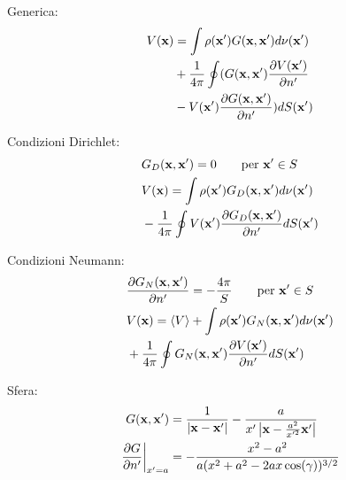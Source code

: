 Generica:
\begin{align*}
	V({\bf x})%
	&= \int \rho({\bf x'})G({\bf x},{\bf x'}) d\nu({\bf x'})\\%
	&+ \frac{1}{4\pi} \oint (%
		G({\bf x},{\bf x'})\frac{\p V({\bf x'})}{\p n'}\\%
	&- V({\bf x'}) \frac{\p G({\bf x},{\bf x'})}{\p n'}%
	) dS({\bf x'})
\end{align*}

Condizioni Dirichlet:
\begin{align*}
	&G_D({\bf x},{\bf x'}) = 0 \qquad \text{per } {\bf x'} \in S \\
	&V({\bf x}) = \int \rho({\bf x'})G_D({\bf x},{\bf x'}) d\nu({\bf x'})\\%
	&- \frac{1}{4\pi} \oint V({\bf x'}) \frac{\p G_D({\bf x},{\bf x'})}{\p n'} dS({\bf x'})
\end{align*}

Condizioni Neumann:
\begin{align*}
	&\frac{\p G_N({\bf x},{\bf x'})}{\p n'} = - \frac{4\pi}{S} \qquad \text{per } {\bf x'} \in S \\
	&V({\bf x}) = \langle V \rangle + \int \rho({\bf x'})G_N({\bf x},{\bf x'}) d\nu({\bf x'})\\%
	&+ \frac{1}{4\pi} \oint G_N({\bf x},{\bf x'})\frac{\p V({\bf x'})}{\p n'} dS({\bf x'})
\end{align*}


Sfera:
\begin{align*}
	G({\bf x}, {\bf x'}) &= \frac{1}{\left|{\bf x} - {\bf x'}\right|} - \frac{a}{x'\left|{{\bf x} - \frac{a^2}{x'^2}{\bf x'}}\right|} \\
	\left. \frac{\partial G}{\partial n'} \right|_{x'=a} &= - \frac{x^2 - a^2}{a(x^2 + a^2 - 2ax\cos(\gamma))^{3/2}}
\end{align*}
